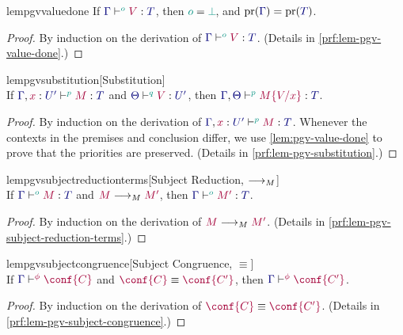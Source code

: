 \documentclass[main.tex]{subfiles}
\begin{document}
\begin{restatablelemma}{lempgvvaluedone}
  \label{lem:pgv-value-done}
  If $\tseq[\cs{o}]{\ty{\Gamma}}{V}{T}$, then $\cs{o}=\cs{\pbot}$, and $\pr(\ty{\Gamma})=\pr(\ty{T})$.
\end{restatablelemma}
\begin{proof}
  By induction on the derivation of $\tseq[\cs{o}]{\ty{\Gamma}}{V}{T}$.
  (Details in \cref{prf:lem-pgv-value-done}.)
\end{proof}

\begin{restatablelemma}{lempgvsubstitution}[Substitution]
  \label{lem:pgv-substitution}
  \hfill\\%
  If $\tseq[\cs{p}]{\ty{\Gamma},\tmty{x}{U'}}{M}{T}$ and $\tseq[\cs{q}]{\ty{\Theta}}{V}{U'}$, then $\tseq[\cs{p}]{\ty{\Gamma},\ty{\Theta}}{\subst{M}{V}{x}}{T}$.
\end{restatablelemma}
\begin{proof}
  By induction on the derivation of $\tseq[\cs{p}]{\ty{\Gamma},\tmty{x}{U'}}{M}{T}$. Whenever the contexts in the premises and conclusion differ, we use \cref{lem:pgv-value-done} to prove that the priorities are preserved.
  (Details in \cref{prf:lem-pgv-substitution}.)
\end{proof}

\begin{restatablelemma}{lempgvsubjectreductionterms}[Subject Reduction, $\longrightarrow_{M}$]
  \label{lem:pgv-subject-reduction-terms}
  \hfill\\%
  If $\tseq[\cs{o}]{\ty{\Gamma}}{M}{T}$ and $\tm{M}\tred\tm{M'}$,
  then $\tseq[\cs{o}]{\ty{\Gamma}}{M'}{T}$.
\end{restatablelemma}
\begin{proof}
  By induction on the derivation of $\tm{M}\tred\tm{M'}$.
  (Details in \cref{prf:lem-pgv-subject-reduction-terms}.)
\end{proof}

\begin{restatablelemma}{lempgvsubjectcongruence}[Subject Congruence, $\equiv$]
  \label{lem:pgv-subject-congruence}
  \hfill\\%
  If $\cseq[\phi]{\ty{\Gamma}}{\conf{C}}$ and $\tm{\conf{C}}\equiv\tm{\conf{C'}}$,
  then $\cseq[\phi]{\ty{\Gamma}}{\conf{C'}}$.
\end{restatablelemma}
\begin{proof}
  By induction on the derivation of $\tm{\conf{C}}\equiv\tm{\conf{C'}}$.
  (Details in \cref{prf:lem-pgv-subject-congruence}.)
\end{proof}
\end{document}
